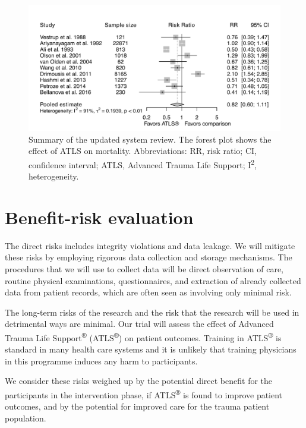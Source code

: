 \documentclass[
]{scrartcl}
\begin{document}
\begin{figure}

{\centering \includegraphics{forest-plot.png}

}

\caption{\label{fig-forest-plot}Summary of the updated system review.
The forest plot shows the effect of ATLS on mortality. Abbreviations:
RR, risk ratio; CI, confidence interval; ATLS, Advanced Trauma Life
Support; I\textsuperscript{2}, heterogeneity.}

\end{figure}

\hypertarget{benefit-risk-evaluation}{%
\section{Benefit-risk evaluation}\label{benefit-risk-evaluation}}

The direct risks includes integrity violations and data leakage. We will
mitigate these risks by employing rigorous data collection and storage
mechanisms. The procedures that we will use to collect data will be
direct observation of care, routine physical examinations,
questionnaires, and extraction of already collected data from patient
records, which are often seen as involving only minimal risk.

The long-term risks of the research and the risk that the research will
be used in detrimental ways are minimal. Our trial will assess the
effect of Advanced Trauma Life Support\textsuperscript{®}
(ATLS\textsuperscript{®}) on patient outcomes. Training in
ATLS\textsuperscript{®} is standard in many health care systems and it
is unlikely that training physicians in this programme induces any harm
to participants.

We consider these risks weighed up by the potential direct benefit for
the participants in the intervention phase, if ATLS\textsuperscript{®}
is found to improve patient outcomes, and by the potential for improved
care for the trauma patient population.
\end{document}
